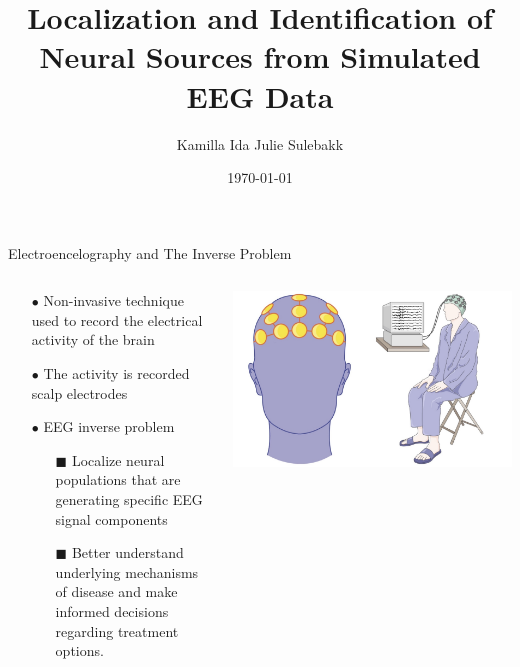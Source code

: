 \documentclass[aspectratio=169, 9pt]{beamer}
\title{Localization and Identification of Neural Sources from Simulated EEG Data}
\author{Kamilla Ida Julie Sulebakk}
\date{\today}
\begin{document}
\maketitle


\begin{frame}{Electroencelography and The Inverse Problem}
  \begin{columns}
    \begin{column}{0.5\textwidth}
      \begin{itemize}
        \item[$\bullet$] Non-invasive technique used to record the electrical activity of the brain
        \item[$\bullet$] The activity is recorded scalp electrodes
        \item[$\bullet$] EEG inverse problem
        \begin{itemize}
          \item[\tiny$\blacksquare$] Localize neural populations that are generating specific EEG signal components
          \item[\tiny$\blacksquare$] Better understand underlying mechanisms of disease and make informed decisions regarding treatment options.
        \end{itemize}
      \end{itemize}
    \end{column}
    \begin{column}{0.5\textwidth}
      \includegraphics[width=1\textwidth]{figures/new_eeg_wiki.jpg}
    \end{column}
  \end{columns}
\end{frame}
\end{document}
